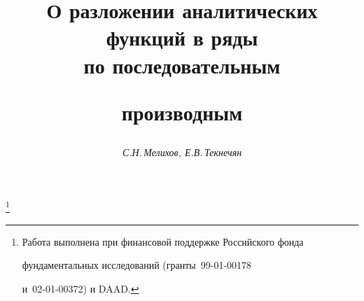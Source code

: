 









\newcommand{\re}{\operatorname{Re}}


\newcommand{\Int}{\operatorname{int}}


\newcommand{\Ker}{\operatorname{Ker}}


\newcommand{\dist}{\operatorname{dist}}




\renewcommand{\baselinestretch}{0.98}


\newcommand{\tts}[1]{}







\setcounter{page}{75}















\author{\it С.Н.\,Мелихов, Е.В.\,Текнечян}




\title{О разложении аналитических функций в ряды\\ по последовательным


производным}


\thanks{Работа выполнена при финансовой поддержке Российского фонда


фундаментальных исследований (гранты \No\,99-01-00178


и \No\,02-01-00372) и DAAD.}





